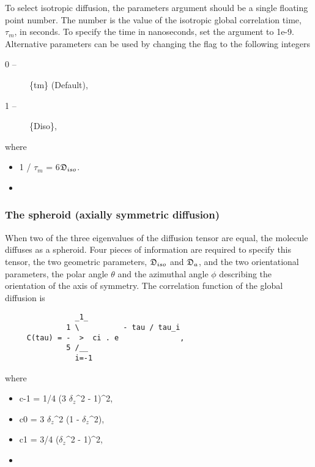 To select isotropic diffusion, the parameters argument should be a single floating point number.  The number is the value of the isotropic global correlation time, $\tau_m$, in seconds. To specify the time in nanoseconds, set the  argument to 1e-9.  Alternative parameters can be used by changing the  flag to the following integers 
  

 \begin{description} 
 \item[0 --]  \{tm\}   (Default),  
 \item[1 --]  \{Diso\},  
 \end{description} 
  

 where 
  

 \begin{itemize} 
 \item[] 1 / $\tau_m$ = 6$\mathfrak{D}_{iso}$.  
 \item[]  
 \end{itemize} 
  

  
 \subsubsection{The spheroid (axially symmetric diffusion)} 

 When two of the three eigenvalues of the diffusion tensor are equal, the molecule diffuses as a spheroid.  Four pieces of information are required to specify this tensor, the two geometric parameters, $\mathfrak{D}_{iso}$ and $\mathfrak{D}_a$, and the two orientational parameters, the polar angle $\theta$ and the azimuthal angle $\phi$ describing the orientation of the axis of symmetry.  The correlation function of the global diffusion is 
  

 {\footnotesize \begin{verbatim} 
                _1_ 
              1 \          - tau / tau_i 
     C(tau) = -  >  ci . e              , 
              5 /__ 
                i=-1 
 \end{verbatim}} 

 where 
  

 \begin{itemize} 
 \item[] c-1 = 1/4 (3 $\delta_z$\^{}2 - 1)\^{}2,  
 \item[] c0  = 3 $\delta_z$\^{}2 (1 - $\delta_z$\^{}2),  
 \item[] c1  = 3/4 ($\delta_z$\^{}2 - 1)\^{}2,  
 \item[]  
 \end{itemize} 
  

